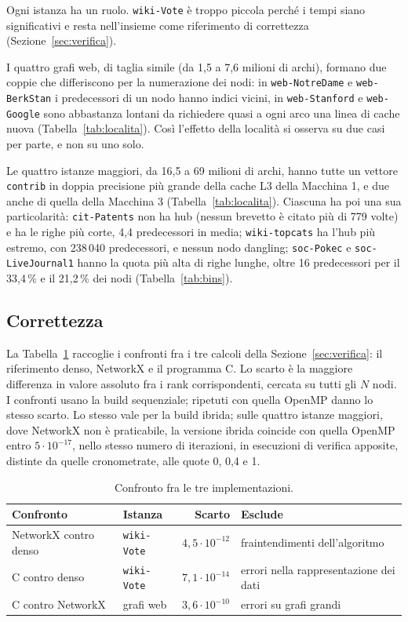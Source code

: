 \documentclass[11pt,a4paper]{article}
\newcommand{\stacco}{\par\medskip\noindent}
\begin{document}
\stacco
Ogni istanza ha un ruolo. \texttt{wiki-Vote} è troppo piccola perché i tempi
siano significativi e resta nell'insieme come riferimento di correttezza
(Sezione~\ref{sec:verifica}).

\stacco
I quattro grafi web, di taglia simile (da 1,5 a 7,6 milioni di archi),
formano due coppie che differiscono per la numerazione dei nodi: in
\texttt{web-NotreDame} e \texttt{web-BerkStan} i predecessori di un nodo
hanno indici vicini, in \texttt{web-Stanford} e \texttt{web-Google} sono
abbastanza lontani da richiedere quasi a ogni arco una linea di cache nuova
(Tabella~\ref{tab:localita}). Così l'effetto della
località si osserva su due casi per parte, e non su uno solo.

\stacco
Le quattro istanze maggiori, da 16,5 a 69 milioni di archi, hanno tutte un
vettore \texttt{contrib} in doppia precisione più grande della cache
L3 della Macchina 1, e due anche di quella della Macchina 3
(Tabella~\ref{tab:localita}). Ciascuna ha poi una sua
particolarità: \texttt{cit-Patents} non ha hub (nessun brevetto è citato più
di 779 volte) e ha le righe più corte, 4,4 predecessori in media;
\texttt{wiki-topcats} ha l'hub più estremo, con 238\,040 predecessori, e
nessun nodo dangling; \texttt{soc-Pokec} e \texttt{soc-LiveJournal1} hanno
la quota più alta di righe lunghe, oltre 16 predecessori per il 33,4\,\% e il
21,2\,\% dei nodi (Tabella~\ref{tab:bins}).

\subsection{Correttezza}
La Tabella~\ref{tab:correttezza} raccoglie i confronti fra i tre calcoli della
Sezione~\ref{sec:verifica}: il riferimento denso, NetworkX e il programma C.
Lo scarto è la maggiore differenza in valore assoluto fra i
rank corrispondenti, cercata su tutti gli $N$ nodi. I confronti usano la build
sequenziale; ripetuti con quella OpenMP danno lo stesso scarto. Lo
stesso vale per la build ibrida; sulle quattro istanze maggiori, dove NetworkX
non è praticabile, la versione ibrida coincide con quella OpenMP entro
$5\cdot10^{-17}$, nello stesso numero di iterazioni, in esecuzioni di verifica
apposite, distinte da quelle cronometrate, alle quote 0, 0,4 e 1.

\begin{table}[h]
\centering
\caption{Confronto fra le tre implementazioni.}
\label{tab:correttezza}
\begin{tabular}{@{}llrl@{}}
\toprule
\textbf{Confronto} & \textbf{Istanza} & \textbf{Scarto} & \textbf{Esclude} \\
\midrule
NetworkX contro denso & \texttt{wiki-Vote} & $4{,}5\cdot10^{-12}$ & fraintendimenti dell'algoritmo \\
C contro denso        & \texttt{wiki-Vote} & $7{,}1\cdot10^{-14}$ & errori nella rappresentazione dei dati \\
C contro NetworkX     & grafi web          & $3{,}6\cdot10^{-10}$ & errori su grafi grandi \\
\bottomrule
\end{tabular}
\end{table}
\end{document}

